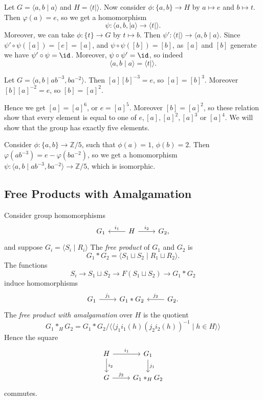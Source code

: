 \documentclass[12pt]{article}
\begin{document}
\begin{exbox}
	Let $G = \langle a, b \mid a \rangle$ and $H = \langle t \mid \rangle$. Now consider $\phi : \{a, b\} \to H$ by $a \mapsto e$ and $b \mapsto t$. Then $\varphi(a) = e$, so we get a homomorphism
	 \[
	\psi : \langle a, b, \mid a \rangle \to \langle t \mid \rangle.
	\]
	Moreover, we can take $\phi : \{t\} \to G$ by $t \mapsto b$. Then $\psi' : \langle t \mid \rangle \to \langle a, b \mid a \rangle$. Since $\psi' \circ \psi([a]) = [e] = [a]$, and  $\psi \circ \psi([b]) = [b]$, as $[a]$ and $[b]$ generate we have $\psi' \circ \psi = \id$. Moreover, $\psi \circ \psi' = \id$, so indeed
	\[
	\langle a, b \mid a \rangle = \langle t \mid \rangle.
	\]
\end{exbox}

\begin{exbox}
	Let $G = \langle a, b \mid ab^{-3}, ba^{-2} \rangle$. Then $[a][b]^{-3} = e$, so $[a] = [b]^3$. Moreover $[b][a]^{-2} = e$, so $[b] = [a]^2$.

	Hence we get $[a] = [a]^6$, or $e = [a]^5$. Moreover $[b] = [a]^2$, so these relation show that every element is equal to one of $e, [a], [a]^2, [a]^3$ or $[a]^4$. We will show that the group has exactly five elements.

	Consider $\phi : \{a, b\} \to \mathbb{Z}/5$, such that $\phi(a) = 1$, $\phi(b) = 2$. Then $\varphi(ab^{-3}) = e - \varphi(ba^{-2})$, so we get a homomorphism $\psi : \langle a, b \mid ab^{-3}, ba^{-2} \rangle \to \mathbb{Z} / 5$, which is isomorphic.
\end{exbox}

\subsection{Free Products with Amalgamation}
\label{sub:fp}

Consider group homomorphisms
\[
\begin{tikzcd}
	G_1 & H \arrow[l, "i_1"'] \arrow[r, "i_2"] & G_2,
\end{tikzcd}
\]
and suppose $G_i = \langle S_i \mid R_i \rangle$ The \emph{free product} of $G_1$ and $G_2$ is
\[
G_1 \ast G_2 = \langle S_1 \sqcup S_2 \mid R_1 \sqcup R_2 \rangle.
\]
The functions
\[
S_i \to S_1 \sqcup S_2 \to F(S_1 \sqcup S_2) \to G_1 \ast G_2
\]
induce homomorphisms
\[
\begin{tikzcd}
	G_1 \arrow[r, "j_1"] & G_1 \ast G_2 & \arrow[l, "j_2"'] G_2.
\end{tikzcd}
\]
The \emph{free product with amalgamation} over $H$ is the quotient
\[
G_1 \ast_H G_2 = G_1 \ast G_2 / \langle \langle j_1 i_1(h) (j_2 i_2(h))^{-1} \mid h \in H \rangle \rangle
\]
Hence the square
\[
\begin{tikzcd}
	H \arrow[r, "i_1"]\arrow[d, "i_2"] & G_1 \arrow[d, "j_1"] \\
	G \arrow[r, "j_2"] & G_1 \ast_H G_2
\end{tikzcd}
\]
commutes.
\end{document}
